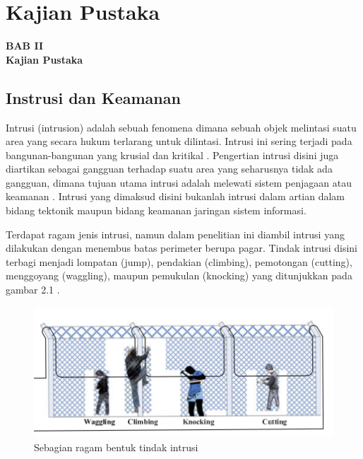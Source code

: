 \documentclass[12pt]{article}
\begin{document}

\newpage
\thispagestyle{plain}
\mbox{}


\newpage

	\setcounter{figure}{0}

	\section{Kajian Pustaka}
	
	\begin{center}
		{\large \textbf{BAB II}} \\
		{\large \textbf{Kajian Pustaka}}
	\end{center}

	\subsection{Instrusi dan Keamanan}
	
	Intrusi (intrusion) adalah sebuah fenomena dimana sebuah objek melintasi suatu area yang secara hukum terlarang untuk dilintasi.
	Intrusi ini sering terjadi pada bangunan-bangunan yang krusial dan kritikal \cite{Quwaider2017}.
	Pengertian intrusi disini juga diartikan sebagai gangguan terhadap suatu area yang seharusnya tidak ada gangguan, dimana tujuan utama intrusi adalah melewati sistem penjagaan atau keamanan \cite{Chapman}.
	Intrusi yang dimaksud disini bukanlah intrusi dalam artian dalam bidang tektonik maupun bidang keamanan jaringan sistem informasi.
	
	Terdapat ragam jenis intrusi, namun dalam penelitian ini diambil intrusi yang dilakukan dengan menembus batas perimeter berupa pagar.
	Tindak intrusi disini terbagi menjadi lompatan (jump), pendakian (climbing), pemotongan (cutting), menggoyang (waggling), maupun pemukulan (knocking) yang ditunjukkan pada gambar 2.1 \cite{Huang2017}.

	\begin{figure}[h!]
		\centering
		\captionsetup{justification=centering}
   		\includegraphics[width=0.7\linewidth]{images/Bab_2/Bab_2_1}
		\caption[Ragam Intrusi]{\small{Sebagian ragam bentuk tindak intrusi}}
	\end{figure}
\end{document}
